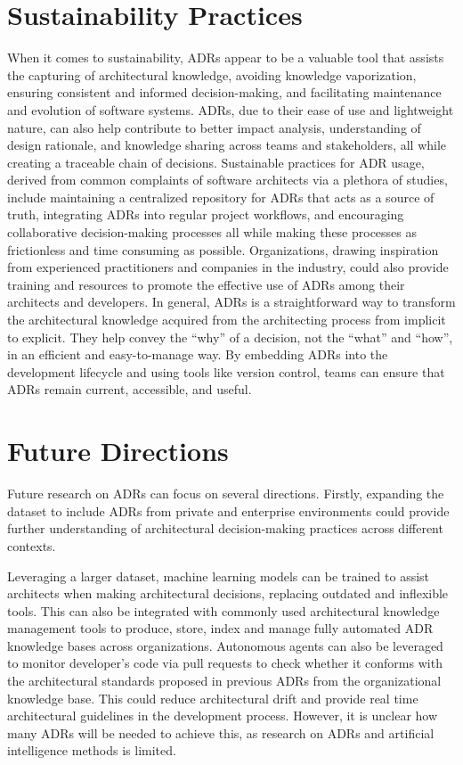     \section{Sustainability Practices}
        When it comes to sustainability, ADRs appear to be a valuable tool that assists the capturing of architectural knowledge, avoiding knowledge vaporization, ensuring consistent and informed decision-making, and facilitating maintenance and evolution of software systems. ADRs, due to their ease of use and lightweight nature, can also help contribute to better impact analysis, understanding of design rationale, and knowledge sharing across teams and stakeholders, all while creating a traceable chain of decisions. Sustainable practices for ADR usage, derived from common complaints of software architects via a plethora of studies, include maintaining a centralized repository for ADRs that acts as a source of truth, integrating ADRs into regular project workflows, and encouraging collaborative decision-making processes all while making these processes as frictionless and time consuming as possible. Organizations, drawing inspiration from experienced practitioners and companies in the industry, could also provide training and resources to promote the effective use of ADRs among their architects and developers. In general, ADRs is a straightforward way to transform the architectural knowledge acquired from the architecting process from implicit to explicit. They help convey the ``why'' of a decision, not the ``what'' and ``how'', in an efficient and easy-to-manage way. By embedding ADRs into the development lifecycle and using tools like version control, teams can ensure that ADRs remain current, accessible, and useful. 
    \section{Future Directions}
        Future research on ADRs can focus on several directions. Firstly, expanding the dataset to include ADRs from private and enterprise environments could provide further understanding of architectural decision-making practices across different contexts.
        
        Leveraging a larger dataset, machine learning models can be trained to assist architects when making architectural decisions, replacing outdated and inflexible tools. This can also be integrated with commonly used architectural knowledge management tools to produce, store, index and manage fully automated ADR knowledge bases across organizations. Autonomous agents can also be leveraged to monitor developer's code via pull requests to check whether it conforms with the architectural standards proposed in previous ADRs from the organizational knowledge base. This could reduce architectural drift and provide real time architectural guidelines in the development process. However, it is unclear how many ADRs will be needed to achieve this, as research on ADRs and artificial intelligence methods is limited. 
        

